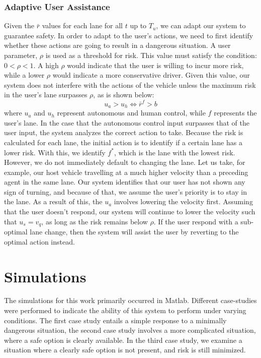 \documentclass[conference]{IEEEtran}
\begin{document}
\subsubsection{Adaptive User Assistance}
Given the $\bar{r}$ values for each lane for all $t$ up to $T_u$, we can adapt our system to guarantee safety. In order to adapt to the user's actions, we need to first identify whether these actions are going to result in a dangerous situation. A user parameter, $\rho$ is used as a threshold for risk. This value must satisfy the condition: $0<\rho<1$. A high $\rho$ would indicate that the user is willing to incur more risk, while a lower $\rho$ would indicate a more conservative driver. Given this value, our system does not interfere with the actions of the vehicle unless the maximum risk in the user's lane surpasses $\rho$, as is shown below:
\begin{equation}
    u_a > u_h \iff \bar r^{f} > b
\end{equation}
where $u_a$ and $u_h$ represent autonomous and human control, while $f$ represents the user's lane. In the case that the autonomous control input surpasses that of the user input, the system analyzes the correct action to take. Because the risk is calculated for each lane, the initial action is to identify if a certain lane has a lower risk. With this, we identify $f^*$, which is the lane with the lowest risk. However, we do not immediately default to changing the lane. Let us take, for example, our host vehicle travelling at a much higher velocity than a preceding agent in the same lane. Our system identifies that our user has not shown any sign of turning, and because of that, we assume the user's priority is to stay in the lane. As a result of this, the $u_a$ involves lowering the velocity first. Assuming that the user doesn't respond, our system will continue to lower the velocity such that $u_s = v_q$, as long as the risk remains below $\rho$. If the user respond with a sub-optimal lane change, then the system will assist the user by reverting to the optimal action instead.  

 
 
 
	



\section{Simulations}
The simulations for this work primarily occurred in Matlab. Different case-studies were performed to indicate the ability of this system to perform under varying conditions. The first case study entails a simple response to a minimally dangerous situation, the second case study involves a more complicated situation, where a safe option is clearly available. In the third case study, we examine a situation where a clearly safe option is not present, and risk is still minimized.
\end{document}

